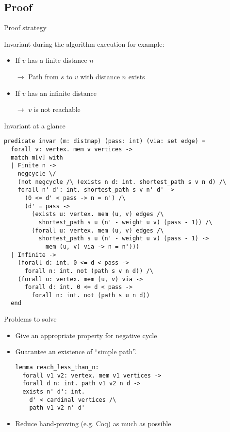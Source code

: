 \documentclass{beamer}
\begin{document}
\subsection{Proof}

\begin{frame}{Proof strategy}

Invariant during the algorithm execution for example:

\begin{itemize}

\item If $v$ has a \alert{finite} distance $n$

$\to$ Path from $s$ to $v$ with distance $n$ exists

\item If $v$ has an \alert{infinite} distance

$\to$ $v$ is not reachable

\end{itemize}

\end{frame}
\begin{frame}[fragile]{Invariant at a glance}
\footnotesize
\begin{lstlisting}[language=why3]
predicate invar (m: distmap) (pass: int) (via: set edge) =
  forall v: vertex. mem v vertices ->
  match m[v] with
  | Finite n ->
    negcycle \/
    (not negcycle /\ (exists n d: int. shortest_path s v n d) /\
    forall n' d': int. shortest_path s v n' d' ->
      (0 <= d' < pass -> n = n') /\
      (d' = pass ->
        (exists u: vertex. mem (u, v) edges /\
          shortest_path s u (n' - weight u v) (pass - 1)) /\
        (forall u: vertex. mem (u, v) edges /\
          shortest_path s u (n' - weight u v) (pass - 1) ->
            mem (u, v) via -> n = n')))
  | Infinite ->
    (forall d: int. 0 <= d < pass ->
      forall n: int. not (path s v n d)) /\
    (forall u: vertex. mem (u, v) via ->
      forall d: int. 0 <= d < pass ->
        forall n: int. not (path s u n d))
  end
\end{lstlisting}
\end{frame}


\begin{frame}[fragile]{Problems to solve}

\begin{itemize}

\item Give an appropriate property for negative cycle

\item Guarantee an existence of ``simple path''.

\begin{lstlisting}[language=why3]
lemma reach_less_than_n:
  forall v1 v2: vertex. mem v1 vertices ->
  forall d n: int. path v1 v2 n d ->
  exists n' d': int.
    d' < cardinal vertices /\
    path v1 v2 n' d'
\end{lstlisting}

\item Reduce hand-proving (e.g. Coq) as much as possible

\end{itemize}
\end{frame}
\end{document}
